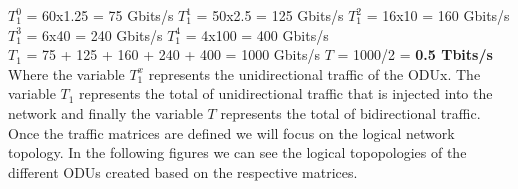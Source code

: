 $T_1^0$ = 60x1.25 = 75 Gbits/s \qquad
$T_1^1$ = 50x2.5 = 125 Gbits/s \qquad
$T_1^2$ = 16x10 = 160 Gbits/s \\

$T_1^3$ = 6x40 = 240 Gbits/s \quad
$T_1^4$ = 4x100 = 400 Gbits/s \\

$T_{1}$ = 75 + 125 + 160 + 240 + 400 = 1000 Gbits/s \qquad
$T$ = 1000/2 = \textbf{0.5 Tbits/s}\\

Where the variable $T_1^x$ represents the unidirectional traffic of the ODUx. The variable $T_{1}$ represents the total of unidirectional traffic that is injected into the network and finally the variable $T$ represents the total of bidirectional traffic.\\

Once the traffic matrices are defined we will focus on the logical network topology. In the following figures we can see the logical topopologies of the different ODUs created based on the respective matrices.

